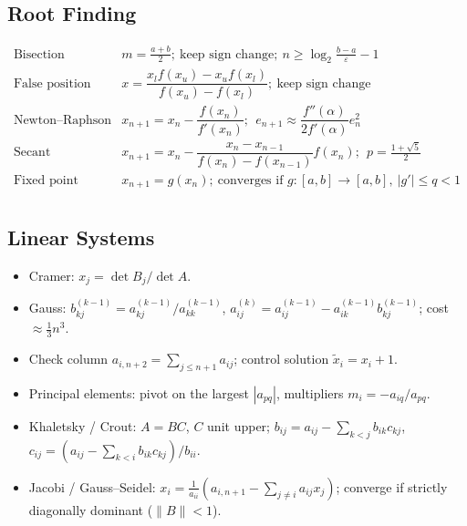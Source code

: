 \documentclass[hidelinks]{article}
\newcommand{\abs}[1]{\left|#1\right|}
\begin{document}
\subsection{Root Finding}
\[
\begin{array}{ll}
\text{Bisection} & m=\frac{a+b}2;\ \text{keep sign change};\ n\ge\log_2\frac{b-a}\varepsilon-1\\[4pt]
\text{False position} & x=\dfrac{x_lf(x_u)-x_uf(x_l)}{f(x_u)-f(x_l)};\ \text{keep sign change}\\[8pt]
\text{Newton--Raphson} & x_{n+1}=x_n-\dfrac{f(x_n)}{f'(x_n)};\ \ e_{n+1}\approx\dfrac{f''(\alpha)}{2f'(\alpha)}e_n^2\\[8pt]
\text{Secant} & x_{n+1}=x_n-\dfrac{x_n-x_{n-1}}{f(x_n)-f(x_{n-1})}f(x_n);\ \ p=\frac{1+\sqrt5}2\\[8pt]
\text{Fixed point} & x_{n+1}=g(x_n);\ \text{converges if }g:[a,b]\to[a,b],\ \abs{g'}\le q<1\\
\end{array}
\]

\subsection{Linear Systems}
\begin{itemize}
    \item Cramer: $x_j=\det B_j/\det A$.
    \item Gauss: $b^{(k-1)}_{kj}=a^{(k-1)}_{kj}/a^{(k-1)}_{kk}$, $a^{(k)}_{ij}=a^{(k-1)}_{ij}-a^{(k-1)}_{ik}b^{(k-1)}_{kj}$; cost $\approx\frac13n^3$.
    \item Check column $a_{i,n+2}=\sum_{j\le n+1}a_{ij}$; control solution $\tilde x_i=x_i+1$.
    \item Principal elements: pivot on the largest $\abs{a_{pq}}$, multipliers $m_i=-a_{iq}/a_{pq}$.
    \item Khaletsky / Crout: $A=BC$, $C$ unit upper; $b_{ij}=a_{ij}-\sum_{k<j}b_{ik}c_{kj}$, $c_{ij}=(a_{ij}-\sum_{k<i}b_{ik}c_{kj})/b_{ii}$.
    \item Jacobi / Gauss--Seidel: $x_i=\frac1{a_{ii}}(a_{i,n+1}-\sum_{j\ne i}a_{ij}x_j)$; converge if strictly diagonally dominant ($\|B\|<1$).
\end{itemize}
\end{document}
